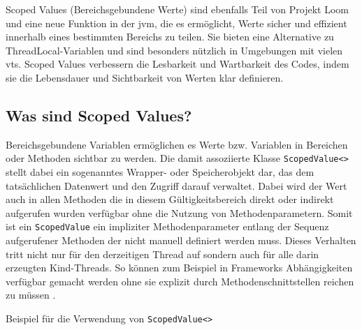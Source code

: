     Scoped Values (Bereichsgebundene Werte) sind ebenfalls Teil von Projekt Loom und eine neue Funktion in der \gls{jvm}, die es ermöglicht,
    Werte sicher und effizient innerhalb eines bestimmten Bereichs zu teilen.
    Sie bieten eine Alternative zu ThreadLocal-Variablen und sind besonders nützlich in Umgebungen mit vielen \Glspl{vt}. 
    Scoped Values verbessern die Lesbarkeit und Wartbarkeit des Codes, indem sie die Lebensdauer und Sichtbarkeit von Werten klar definieren.
    
\subsection{Was sind Scoped Values?}
\label{subsec:WasSindSV?}
    Bereichsgebundene Variablen ermöglichen es Werte bzw. Variablen in Bereichen oder Methoden sichtbar zu werden. 
    Die damit assoziierte Klasse \texttt{ScopedValue<>} stellt dabei ein sogenanntes Wrapper- oder Speicherobjekt dar, das dem tatsächlichen Datenwert und den Zugriff darauf verwaltet.
    Dabei wird der Wert auch in allen Methoden die in diesem Gültigkeitsbereich direkt oder indirekt aufgerufen wurden verfügbar ohne die Nutzung von Methodenparametern.
    Somit ist ein \texttt{ScopedValue} ein impliziter Methodenparameter entlang der Sequenz aufgerufener Methoden der nicht manuell definiert werden muss.
    Dieses Verhalten tritt nicht nur für den derzeitigen Thread auf sondern auch für alle darin erzeugten Kind-Threads.
    So können zum Beispiel in Frameworks Abhängigkeiten verfügbar gemacht werden ohne sie explizit durch Methodenschnittstellen reichen zu müssen \cite{JEP481}. 
    \begin{program} [H]
        \caption{Beispiel für die Verwendung von \texttt{ScopedValue<>}}
        \label{prog:VerwendungVonSV}
    \begin{JavaCode}[language=Java, numbers=left]
public class ScopedValueExample {
    private static final ScopedValue<String> someName = ScopedValue.newInstance();
    private static final ScopedValue<String> someName2 = ScopedValue.newInstance();

    public static void main(String[] args) {
        ScopedValue.Carrier carrier = ScopedValue.where(someName, "Alice");
        carrier.where(someName2, "Herbert").run(()->{
            System.out.println(STR."Name: \{someName2.get()}");
            printName();
            ScopedValue.where(someName, "Bob").run(ScopedValueExample::printName);
            System.out.println(STR."Name: \{someName.get()}");
        });
        if (someName.isBound()) {
            System.out.println(STR."Name: \{someName.get()}");
        } else {
            System.out.println(STR."someName is not bound");
        }
    }

    private static void printName() {
        System.out.println(STR."Name: \{someName.get()}");
    }
}\end{JavaCode}
    \end{program}   
